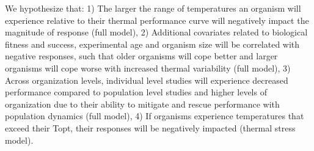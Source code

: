 \documentclass[12pt,twoside]{reedthesis}
\begin{document}
We hypothesize that: 1) The larger the range of temperatures an organism will experience relative to their thermal performance curve will negatively impact the magnitude of response (full model), 2) Additional covariates related to biological fitness and success, experimental age and organism size will be correlated with negative responses, such that older organisms will cope better and larger organisms will cope worse with increased thermal variability (full model), 3) Across organization levels, individual level studies will experience decreased performance compared to population level studies and higher levels of organization due to their ability to mitigate and rescue performance with population dynamics (full model), 4) If organisms experience temperatures that exceed their Topt, their responses will be negatively impacted (thermal stress model).
\end{document}
